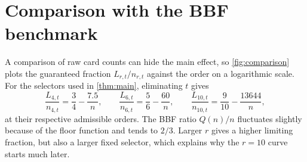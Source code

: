 \documentclass[11pt]{article}
\begin{document}
\section{Comparison with the BBF benchmark}\label{sec:plot}
A comparison of raw card counts can hide the main effect, so \cref{fig:comparison} plots the guaranteed
fraction $L_{r,t}/n_{r,t}$ against the order on a logarithmic scale. For the selectors used in
\cref{thm:main}, eliminating $t$ gives
\[
 \frac{L_{4,t}}{n_{4,t}}=\frac34-\frac{7.5}{n},\qquad
 \frac{L_{6,t}}{n_{6,t}}=\frac56-\frac{60}{n},\qquad
 \frac{L_{10,t}}{n_{10,t}}=\frac9{10}-\frac{13644}{n},
\]
at their respective admissible orders. The BBF ratio $Q(n)/n$ fluctuates slightly because of the floor
function and tends to $2/3$. Larger $r$ gives a higher limiting fraction, but also a larger fixed
selector, which explains why the $r=10$ curve starts much later.
\end{document}
